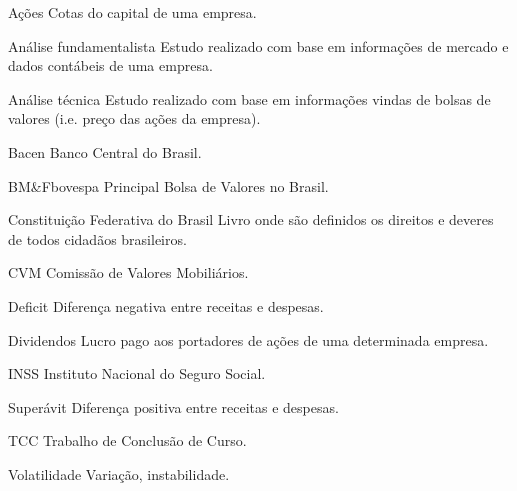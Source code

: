 \begin{siglas}

  \item[Ações] Cotas do capital de uma empresa.
  \item[Análise fundamentalista] Estudo realizado com base em informações de mercado e dados contábeis de uma empresa.
  \item[Análise técnica] Estudo realizado com base em informações vindas de bolsas de valores (i.e. preço das ações da empresa).
  \item[Bacen] Banco Central do Brasil.
  \item[BM\&Fbovespa] Principal Bolsa de Valores no Brasil.
  \item[Constituição Federativa do Brasil] Livro onde são definidos os direitos e deveres de todos cidadãos brasileiros.
  \item[CVM] Comissão de Valores Mobiliários.
  \item[Deficit] Diferença negativa entre receitas e despesas.
  \item[Dividendos] Lucro pago aos portadores de ações de uma determinada empresa.
  \item[INSS] Instituto Nacional do Seguro Social.
  \item[Superávit] Diferença positiva entre receitas e despesas.
  \item[TCC] Trabalho de Conclusão de Curso.
  \item[Volatilidade] Variação, instabilidade.
 

\end{siglas}

